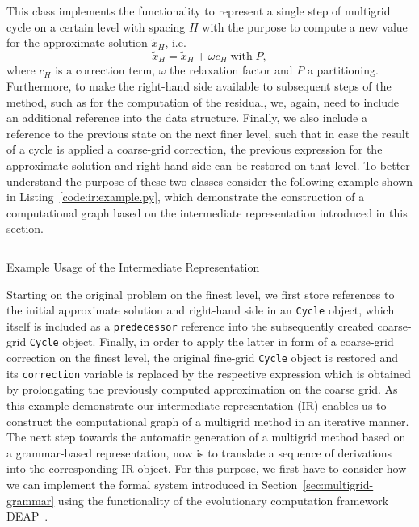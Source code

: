 This class implements the functionality to represent a single step of multigrid cycle on a certain level with spacing $H$ with the purpose to compute a new value for the approximate solution $\tilde{x}_H$, i.e.
\begin{equation}
	\tilde{x}_H = \tilde{x}_H + \omega c_H \; \text{with} \; P,
\end{equation}
where $c_H$ is a correction term, $\omega$ the relaxation factor and $P$ a partitioning.
Furthermore, to make the right-hand side available to subsequent steps of the method, such as for the computation of the residual, we, again, need to include an additional reference into the data structure.
Finally, we also include a reference to the previous state on the next finer level, such that in case the result of a cycle is applied a coarse-grid correction, the previous expression for the approximate solution and right-hand side can be restored on that level.
To better understand the purpose of these two classes consider the following example shown in Listing~\ref{code:ir:example.py}, which demonstrate the construction of a computational graph based on the intermediate representation introduced in this section.
\begin{listing}
	\inputminted{python}{evostencils/ir/example.py}
	\caption{Example Usage of the Intermediate Representation}
	\label{code:ir:example.py}
\end{listing}
Starting on the original problem on the finest level, we first store references to the initial approximate solution and right-hand side in an \texttt{Cycle} object, which itself is included as a \texttt{predecessor} reference into the subsequently created coarse-grid \texttt{Cycle} object.
Finally, in order to apply the latter in form of a coarse-grid correction on the finest level, the original fine-grid \texttt{Cycle} object is restored and its \texttt{correction} variable is replaced by the respective expression which is obtained by prolongating the previously computed approximation on the coarse grid.
As this example demonstrate our intermediate representation (IR) enables us to construct the computational graph of a multigrid method in an iterative manner.
The next step towards the automatic generation of a multigrid method based on a grammar-based representation, now is to translate a sequence of derivations into the corresponding IR object.
For this purpose, we first have to consider how we can implement the formal system introduced in Section~\ref{sec:multigrid-grammar} using the functionality of the evolutionary computation framework DEAP~\cite{rainville2012deap}.
